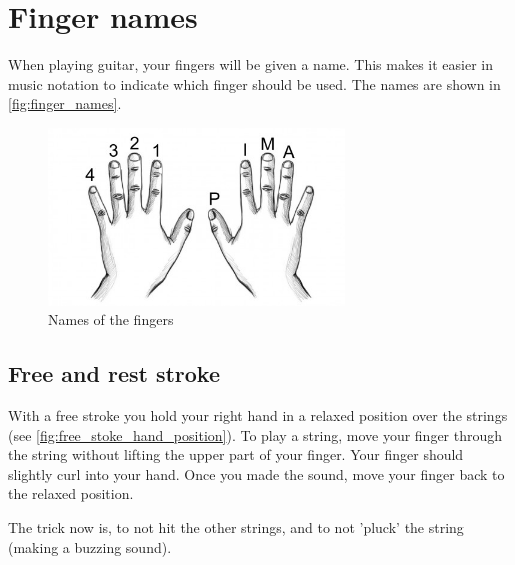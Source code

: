 \section{Finger names}

When playing guitar, your fingers will be given a name. This makes it easier in music notation to indicate which finger should be used. The names are shown in \autoref{fig:finger_names}.

\begin{figure}[h]
    \centering
    \includegraphics[width=0.7\textwidth]{../../Images/guitar-finger-tips_pima.jpg}
    \caption{Names of the fingers \cite{FingerNames}}
    \label{fig:finger_names}
\end{figure}

\subsection{Free and rest stroke}

With a free stroke you hold your right hand in a relaxed position over the strings (see \autoref{fig:free_stoke_hand_position}). To play a string, move your finger through the string without lifting the upper part of your finger. Your finger should slightly curl into your hand. Once you made the sound, move your finger back to the relaxed position.

The trick now is, to not hit the other strings, and to not 'pluck' the string (making a buzzing sound).


